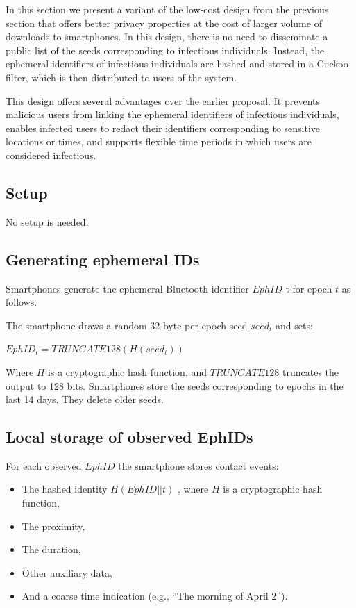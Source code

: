 \documentclass[10.8pt,a4paper]{article}
\begin{document}
In this section we present a variant of the low-cost design from the previous section that offers better privacy properties at the cost of larger volume of downloads to smartphones. In this design, there is no need to disseminate a public list of the seeds corresponding to infectious individuals. Instead, the ephemeral identifiers of infectious individuals are hashed and stored in a Cuckoo filter, which is then distributed to users of the system.

This design offers several advantages over the earlier proposal. It prevents malicious users from linking the ephemeral identifiers of infectious individuals, enables infected users to redact their identifiers corresponding to sensitive locations or times, and supports flexible time periods in which users are considered infectious.

\subsection{Setup}

No setup is needed.

\subsection{Generating ephemeral IDs}

Smartphones generate the ephemeral Bluetooth identifier  $EphID$ t for epoch $ t$ as follows.

The smartphone draws a random 32-byte per-epoch seed $ seed_t$  and sets: 

$EphID_t  = TRUNCATE128( H( seed_t  ) ) $

Where  $H$ is a cryptographic hash function, and  $TRUNCATE128$ truncates the output to 128 bits. Smartphones store the seeds corresponding to epochs in the last 14 days. They delete older seeds.

\subsection{Local storage of observed EphIDs}

For each observed  $EphID $ the smartphone stores contact events:

\begin{itemize}
\item The hashed identity $ H(EphID||t)$ , where $ H$  is a cryptographic hash function,
\item The proximity,
\item The duration,
\item Other auxiliary data,
\item And a coarse time indication (e.g., “The morning of April 2”).
\end{itemize}
\end{document}
